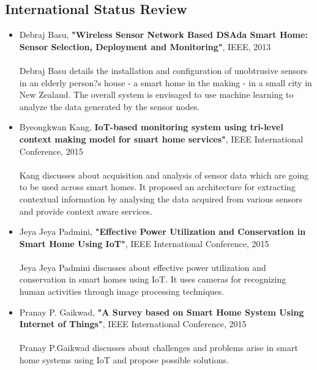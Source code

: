 \documentclass[12pt,a4paper,titlepage,twoside]{article}
\begin{document}
            \subsection{International Status Review}
            \begin{itemize}
                \item Debraj Basu, \textbf{"Wireless Sensor Network Based DSAda Smart Home: Sensor Selection, Deployment and Monitoring"}, IEEE, 2013\\ \\
                Debraj Basu details the installation and configuration of unobtrusive sensors in an elderly person?s house - a smart home in the making - in a small city in New Zealand. The overall system is envisaged to use machine learning to analyze the data generated by the sensor nodes.
                \item Byeongkwan Kang, \textbf{IoT-based monitoring system using tri-level context making model for smart home services"}, IEEE International Conference, 2015\\ \\
                Kang discusses about acquisition and analysis of sensor data which are going to be used across smart homes. It proposed an architecture for extracting contextual information by analysing the data acquired from various sensors and provide context aware services.
                \item Jeya Jeya Padmini, \textbf{"Effective Power Utilization and Conservation in Smart Home Using IoT"}, IEEE International Conference, 2015\\ \\
                Jeya Jeya Padmini discusses about effective power utilization and conservation in smart homes using IoT. It uses cameras for recognizing human activities through image processing techniques.
                \item Pranay P. Gaikwad, \textbf{"A Survey based on Smart Home System Using Internet of Things"}, IEEE International Conference, 2015\\ \\
                Pranay P.Gaikwad discusses about challenges and problems arise in smart home systems using IoT and propose possible solutions.
            \end{itemize}
        
        
\end{document}
